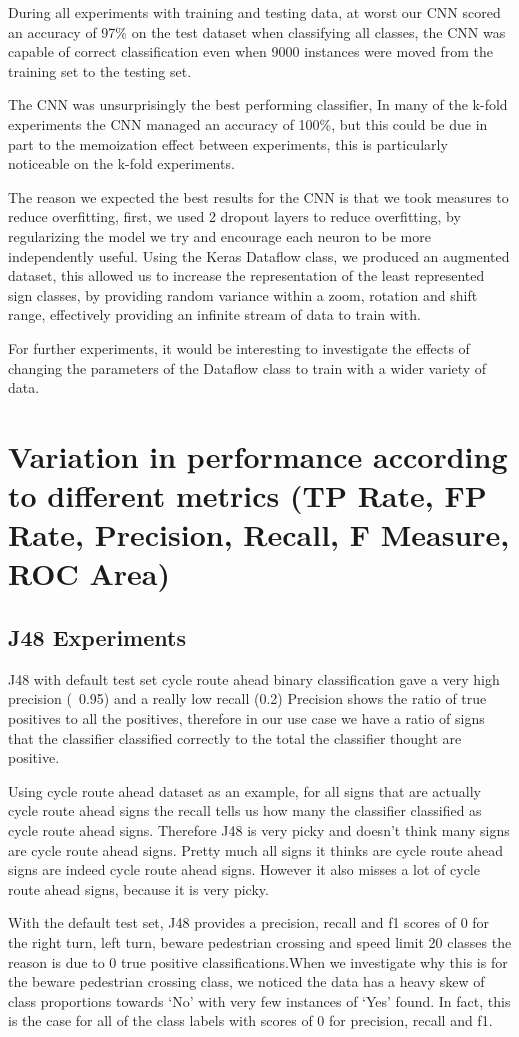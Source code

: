 \documentclass[11pt]{article}
\begin{document}
During all experiments with training and testing data, at worst our CNN scored an accuracy of 97\% on the test dataset when classifying all classes, the CNN was capable of correct classification even when 9000 instances were moved from the training set to the testing set.

The CNN was unsurprisingly the best performing classifier, In many of the k-fold experiments the CNN managed an accuracy of 100\%, but this could be due in part to the memoization effect between experiments, this is particularly noticeable on the k-fold experiments.

The reason we expected the best results for the CNN is that we took measures to reduce overfitting, first, we used 2 dropout layers to reduce overfitting, by regularizing the model we try and encourage each neuron to be more independently useful.
Using the Keras Dataflow class, we produced an augmented dataset, this allowed us to increase the representation of the least represented sign classes, by providing random variance within a zoom, rotation and shift range, effectively providing an infinite stream of data to train with.

For further experiments, it would be interesting to investigate the effects of changing the parameters of the Dataflow class to train with a wider variety of data.



\newpage
\section{Variation in performance according to different metrics (TP Rate, FP Rate, Precision,
Recall, F Measure, ROC Area)}
\subsection{J48 Experiments}

J48 with default test set cycle route ahead binary classification gave a very high precision (~0.95) and a really low recall (0.2) 
Precision shows the ratio of true positives to all the positives, therefore in our use case we have a ratio of signs that the classifier classified correctly to the total the classifier thought are positive. 
\par
Using cycle route ahead dataset as an example, for all signs that are actually cycle route ahead signs the recall tells us how many the classifier classified as cycle route ahead  signs. 
Therefore J48 is very picky and doesn't think many signs are cycle route ahead signs. Pretty much all signs it thinks are cycle route ahead signs are indeed cycle route ahead signs. However it also misses a lot of cycle route ahead signs, because it is very picky.
\par
With the default test set, J48 provides a precision, recall and f1 scores of 0 for the right turn, left turn, beware pedestrian crossing and speed limit 20 classes the reason is due to 0 true positive classifications.When we investigate why this is for the beware pedestrian crossing class, we noticed the data has a heavy skew of class proportions towards ‘No’ with very few instances of ‘Yes’ found. In fact, this is the case for all of the class labels with scores of 0 for precision, recall and f1.
\end{document}
